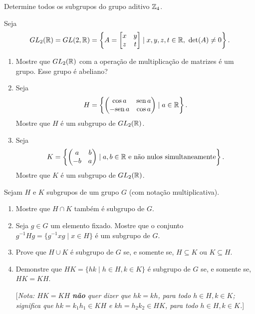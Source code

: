 \documentclass[12pt]{exam}
\begin{document}
    \vspace{.3cm}

    \questao{} Determine todos os subgrupos do grupo aditivo $\mathbb{Z}_4$.

    \vspace{.3cm}

    \questao{} Seja
    \[
    	GL_2(\mathbb{R}) = GL(2, \mathbb{R}) = \left\{A = \begin{bmatrix}x & y\\z & t\end{bmatrix} \mid x, y, z, t \in \mathbb{R},\ \det(A) \ne 0 \right\}.
    \]
    \begin{enumerate}[label=({\alph*})]
      \item Mostre que $GL_2(\mathbb{R})$ com a operação de multiplicação de matrizes é um grupo. Esse grupo é abeliano?

      \item Seja
      \[
          H = \left\{ \begin{pmatrix}
              \cos a & {\rm sen\,} a\\ - {\rm sen\,} a & \cos a
          \end{pmatrix} \mid a \in \mathbb{R}\right\}.
      \]
      Mostre que $H$ é um subgrupo de $GL_2(\mathbb{R})$.

      \item Seja
      \[
          K = \left\{ \begin{pmatrix}
              a & b\\ -b & a
          \end{pmatrix} \mid a, b \in \mathbb{R} \mbox{ e não nulos simultaneamente}\right\}.
      \]
      Mostre que $K$ é um subgrupo de $GL_2(\mathbb{R})$.
    \end{enumerate}

    \questao{} Sejam $H$ e $K$ subgrupos de um grupo $G$ (com notação
    multiplicativa).
    \begin{enumerate}[label=({\alph*})]
      \item Mostre que $H\cap K$ também é subgrupo de $G$.

      \item Seja $g\in G$ um elemento fixado. Mostre que o conjunto
      $g^{-1}Hg=\{ g^{-1}xg \mid x\in H \} $ é um subgrupo de $G$.

      \item Prove que $H\cup K$ é subgrupo de $G$ se, e somente se,
      $H\subseteq K$ ou $K\subseteq H$.

      \item Demonstre que $HK=\{hk \mid h\in H, k\in K\}$ é subgrupo
      de $G$ se, e somente se, $HK=KH$.

      [\emph{Nota: $HK=KH$ \textbf{não} quer dizer que $hk=kh$,
      para todo $h\in H, k\in K$; significa que $hk=k_1h_1 \in KH$ e $kh=h_2k_2 \in
      HK$, para todo $h\in H, k\in K$.}]
    \end{enumerate}
\end{document}
